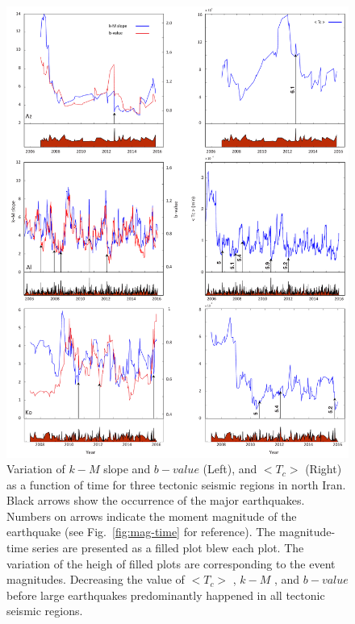   
 \begin{figure} [ht]
\centering
\includegraphics[scale=0.4]{figures/pdf/Figure10.pdf} 
\caption{ Variation of $k-M$ slope  and $b-value$ (Left), and $ < T_c >$ (Right) as a function of time for three tectonic seismic regions in north Iran. Black arrows show the occurrence of the major earthquakes. Numbers on arrows indicate the moment magnitude of the earthquake (see Fig.~\ref{fig:mag-time} for reference).  The magnitude-time series are presented as a filled plot blew each plot. The variation of the heigh of filled plots are corresponding to the event magnitudes. Decreasing the value of  $<T_c>$  ,  $k-M$ , and  $b-value$  before large earthquakes predominantly happened in all tectonic seismic regions.}
\label{fig:tc}
\end{figure}
 
